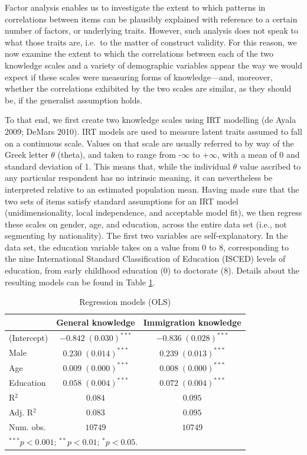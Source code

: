 \documentclass[12pt,halfline,a4paper,]{ouparticle}
\begin{document}
Factor analysis enables us to investigate the extent to which patterns
in correlations between items can be plausibly explained with reference
to a certain number of factors, or underlying traits. However, such
analysis does not speak to what those traits are, i.e.~to the matter of
construct validity. For this reason, we now examine the extent to which
the correlations between each of the two knowledge scales and a variety
of demographic variables appear the way we would expect if these scales
were measuring forms of knowledge---and, moreover, whether the
correlations exhibited by the two scales are similar, as they should be,
if the generalist assumption holds.

To that end, we first create two knowledge scales using IRT modelling
(de Ayala 2009; DeMars 2010). IRT models are used to measure latent
traits assumed to fall on a continuous scale. Values on that scale are
usually referred to by way of the Greek letter \(\theta\) (theta), and
taken to range from -\(\infty\) to +\(\infty\), with a mean of 0 and
standard deviation of 1. This means that, while the individual
\(\theta\) value ascribed to any particular respondent has no intrinsic
meaning, it can nevertheless be interpreted relative to an estimated
population mean. Having made sure that the two sets of items satisfy
standard assumptions for an IRT model (unidimensionality, local
independence, and acceptable model fit), we then regress these scales on
gender, age, and education, across the entire data set (i.e., not
segmenting by nationality). The first two variables are
self-explanatory. In the data set, the education variable takes on a
value from 0 to 8, corresponding to the nine International Standard
Classification of Education (ISCED) levels of education, from early
childhood education (0) to doctorate (8). Details about the resulting
models can be found in Table \ref{tab:4}.

\begin{table}[h!]
\caption{Regression models (OLS)}
\begin{center}
\begin{tabular}{l c c}
\hline
 & General knowledge & Immigration knowledge \\
\hline
(Intercept) & $-0.842 \; (0.030)^{***}$ & $-0.836 \; (0.028)^{***}$ \\
Male        & $0.230 \; (0.014)^{***}$  & $0.239 \; (0.013)^{***}$  \\
Age         & $0.009 \; (0.000)^{***}$  & $0.008 \; (0.000)^{***}$  \\
Education   & $0.058 \; (0.004)^{***}$  & $0.072 \; (0.004)^{***}$  \\
\hline
R$^2$       & $0.084$                   & $0.095$                   \\
Adj. R$^2$  & $0.083$                   & $0.095$                   \\
Num. obs.   & $10749$                   & $10749$                   \\
\hline
\multicolumn{3}{l}{\scriptsize{$^{***}p<0.001$; $^{**}p<0.01$; $^{*}p<0.05$.}}
\end{tabular}
\label{tab:4}
\end{center}
\end{table}
\end{document}
